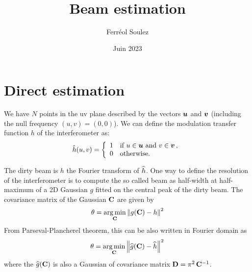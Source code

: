 \documentclass[a4paper,11pt,twoside]{scrartcl}
\title{Beam estimation}
\author{Ferréol Soulez }
\date{Juin 2023}
\begin{document}
\maketitle

\section{Direct estimation}

We have $N$ points in the uv plane described by the vectors $\boldsymbol{u}$ and $\boldsymbol{v}$ (including the null frequency  $(u,v) = (0,0)$). We can define the modulation transfer function $h$ of the interferometer  as:
\begin{equation}
	\hat{h}(u, v) = \left\{
		\begin{array}{ll}
		1 &\text{if } u \in \boldsymbol{u} \text{ and } v \in \boldsymbol{v}\,,\\
		0 &\text{otherwise.}
	\end{array} \right.
\end{equation} 

The dirty beam is $h$  the Fourier transform of $\widehat{h}$. One way to define the resolution of the interferometer is to compute the so called beam as half-width at half-maximum of a 2D Gaussian $g$ fitted on the central peak of the dirty beam. The covariance matrix of the Gaussian $\mathbf{C}$ are given by
\begin{equation}
	\theta =  \argmin_{\M C} \Norm{ g(\M C) - h}^2 
\end{equation}
From  Parseval-Plancherel theorem, this can be also written in Fourier domain as
\begin{equation}
	\theta =  \argmin_{\M C} \Norm{\FT{g}(\M C) - \FT{h}}^2 
\end{equation}
where the $\widehat{g}(\mathbf{C})$ is also a Gaussian of covariance matrix $\mathbf{D} = \pi^2\,\mathbf{C}^{-1}$.
\end{document}

